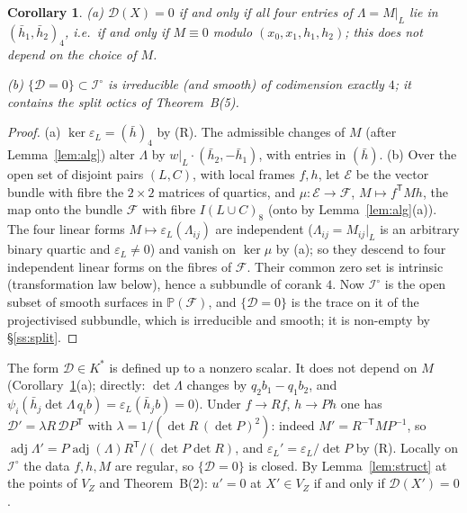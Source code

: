 \documentclass[11pt]{article}
\numberwithin{equation}{section}
\newtheorem{corollary}[theorem]{Corollary}
\theoremstyle{remark}
\newcommand{\PP}{\mathbb{P}}
\newcommand{\VZ}{V_Z}
\newcommand{\cD}{\mathcal{D}}
\newcommand{\cI}{\mathcal{I}}
\newcommand{\adj}{\operatorname{adj}}
\begin{document}
\begin{corollary}\label{cor:L}
\textup{(a)} $\cD(X)=0$ if and only if all four entries of $\Lambda=M|_L$ lie in $(\bar h_1,\bar h_2)_4$, i.e.\ if
and only if $M\equiv0$ modulo $(x_0,x_1,h_1,h_2)$; this does not depend on the choice of $M$.

\textup{(b)} $\{\cD=0\}\subset\cI^\circ$ is irreducible \textup{(}and smooth\textup{)} of codimension exactly
$4$; it contains the split octics of Theorem~\textup{B(5)}.
\end{corollary}
\begin{proof}
(a) $\ker\varepsilon_L=(\bar h)_4$ by (R). The admissible changes of $M$ (after Lemma~\ref{lem:alg}) alter
$\Lambda$ by $w|_L\cdot(\bar h_2,-\bar h_1)$, with entries in $(\bar h)$. (b) Over the open set of disjoint pairs
$(L,C)$, with local frames $f,h$, let $\mathcal E$ be the vector bundle with fibre the $2\times2$ matrices of
quartics, and $\mu\colon\mathcal E\to\mathcal F$, $M\mapsto f^{\mathsf T}Mh$, the map onto the bundle
$\mathcal F$ with fibre $I(L\cup C)_8$ (onto by Lemma~\ref{lem:alg}(a)). The four linear forms
$M\mapsto\varepsilon_L(\Lambda_{ij})$ are independent ($\Lambda_{ij}=M_{ij}|_L$ is an arbitrary binary quartic and
$\varepsilon_L\ne0$) and vanish on $\ker\mu$ by (a); so they descend to four independent linear forms on the
fibres of $\mathcal F$. Their common zero set is intrinsic (transformation law below), hence a subbundle of
corank $4$. Now $\cI^\circ$ is the open subset of smooth surfaces in $\PP(\mathcal F)$, and $\{\cD=0\}$ is the
trace on it of the projectivised subbundle, which is irreducible and smooth; it is non-empty by
\S\ref{ss:split}.
\end{proof}

The form $\cD\in K^*$ is defined up to a nonzero scalar. It does not depend on $M$ (Corollary~\ref{cor:L}(a);
directly: $\det\Lambda$ changes by $q_2b_1-q_1b_2$, and
$\psi_i(\bar h_j\det\Lambda\,q_ib)=\varepsilon_L(\bar h_jb)=0$). Under $f\to Rf$, $h\to Ph$ one has
$\cD'=\lambda R\,\cD P^{\mathsf T}$ with $\lambda=1/(\det R\,(\det P)^2)$: indeed
$M'=R^{-\mathsf T}MP^{-1}$, so $\adj\Lambda'=P\adj(\Lambda)R^{\mathsf T}/(\det P\det R)$, and
$\varepsilon_L'=\varepsilon_L/\det P$ by (R). Locally
on $\cI^\circ$ the data $f,h,M$ are regular, so $\{\cD=0\}$ is closed. By Lemma~\ref{lem:struct} at the points of
$\VZ$ and Theorem~B(2): $u'=0$ at $X'\in\VZ$ if and only if $\cD(X')=0$.
\end{document}
